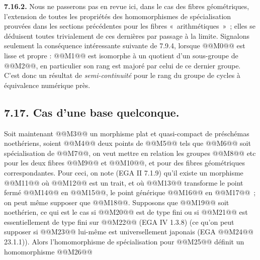 
\textbf{7.16.2.}
Nous ne passerons pas en revue ici, dans le cas des fibres géométriques, l'extension de toutes les propriétés des homomorphismes de spécialisation prouvées dans les sections précédentes pour les fibres «~arithmétiques~»~; elles se déduisent toutes trivialement de ces dernières par passage à la limite. Signalons seulement la conséquence intéressante suivante de 7.9.4, lorsque @@M0@@ est lisse et propre : @@M1@@ est isomorphe à un quotient d'un sous-groupe de @@M2@@, en particulier son rang est majoré par celui de ce dernier groupe. C'est donc un résultat de \emph{semi-continuité} pour le rang du groupe de cycles à équivalence numérique près.

\subsection*{7.17. Cas d'une base quelconque.}
Soit maintenant
@@M3@@
un morphisme plat et quasi-compact de préschémas noethériens, soient @@M4@@ deux points de @@M5@@ tels que @@M6@@ soit spécialisation de @@M7@@, on veut mettre en relation les groupes @@M8@@ etc pour les deux fibres @@M9@@ et @@M10@@, et pour des fibres géométriques correspondantes. Pour ceci, on note (EGA II 7.1.9) qu'il existe un morphisme
@@M11@@
où @@M12@@ est un trait, et où @@M13@@ transforme le point fermé @@M14@@ en @@M15@@, le point générique @@M16@@ en @@M17@@~; on peut même supposer que @@M18@@. Supposons que @@M19@@ soit noethérien, ce qui est le cas si @@M20@@ est de type fini ou si @@M21@@ est essentiellement de type fini sur @@M22@@ (EGA IV 1.3.8) (ce qu'on peut supposer si @@M23@@ lui-même est universellement japonais (EGA @@M24@@ 23.1.1)). Alors l'homomorphisme de spécialisation pour @@M25@@ définit un homomorphisme
@@M26@@

